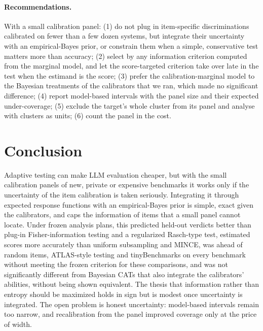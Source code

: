 \paragraph{Recommendations.} With a small calibration panel: (1) do not plug in
item-specific discriminations calibrated on fewer than a few dozen systems, but integrate their
uncertainty with an empirical-Bayes prior, or constrain them when a simple, conservative test
matters more than accuracy; (2) select by any information criterion computed from the marginal
model, and let the score-targeted criterion take over late in the test when the estimand is
the score; (3) prefer the calibration-marginal model to the Bayesian treatments of the
calibrators that we ran, which made no significant difference; (4) report model-based
intervals with the panel size and their expected under-coverage; (5) exclude the target's whole
cluster from its panel and analyse with clusters as units; (6) count the panel in the cost.

\section{Conclusion}
\label{sec:conclusion}

Adaptive testing can make LLM evaluation cheaper, but with the small calibration panels of
new, private or expensive benchmarks it works only if the uncertainty of the item calibration
is taken seriously. Integrating it through expected response functions with an empirical-Bayes
prior is simple, exact given the calibrators, and caps the information of items that a small
panel cannot locate. Under frozen analysis plans, this predicted held-out verdicts better than
plug-in Fisher-information testing and a regularized Rasch-type test, estimated scores more
accurately than uniform subsampling and MINCE, was ahead of random items, ATLAS-style testing
and tinyBenchmarks on every benchmark without meeting the frozen criterion for these
comparisons, and was not significantly different from Bayesian CATs that also integrate the
calibrators' abilities, without being shown equivalent. The thesis that information rather than entropy should be maximized
holds in sign but is modest once uncertainty is integrated. The open problem is honest
uncertainty: model-based intervals remain too narrow, and recalibration from the panel improved
coverage only at the price of width.
